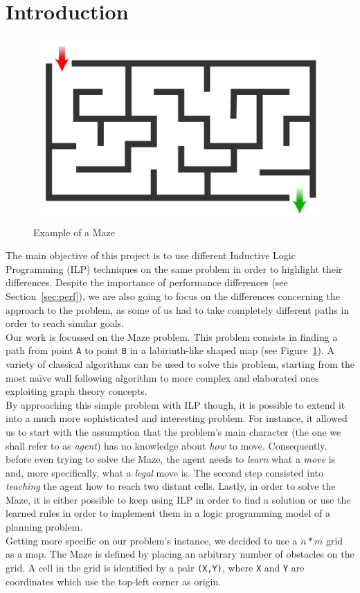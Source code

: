 \section{Introduction}\label{sec:intro}

\begin{figure}[b]
    \centering
    \includegraphics[scale=0.1]{img/Maze_simple.svg.png}
    \caption{Example of a Maze}\label{fig:fig1}
\end{figure}

The main objective of this project is to use different Inductive Logic Programming (ILP) techniques on the same problem in order to highlight
their differences. Despite the importance of performance differences (see Section~\ref{sec:perf}), we are also going to focus on the differences
concerning the approach to the problem, as some of us had to take completely different paths in order to reach similar goals.\\

Our work is focussed on the Maze problem. This problem consists in finding a path from point \texttt{A}
to point \texttt{B} in a labirinth-like shaped map (see Figure~\ref{fig:fig1}). A variety of classical algorithms
can be used to solve this problem, starting from the most naïve wall following algorithm to more complex and elaborated
ones exploiting graph theory concepts.\\
By approaching this simple problem with ILP though, it is possible to extend it into a much more sophisticated and interesting
problem. For instance, it allowed us to start with the assumption that the problem's main character (the
one we shall refer to as \emph{agent}) has no knowledge about \emph{how} to move. Consequently, before even trying
to solve the Maze, the agent needs to \emph{learn} what a \emph{move} is and, more specifically, what a \emph{legal} move is. The second
step consisted into \emph{teaching} the agent how to reach two distant cells. Lastly, in order to solve the Maze, it is either possible
to keep using ILP in order to find a solution or use the learned rules in order to implement them in a logic programming model of a planning
problem.\\

Getting more specific on our problem's instance, we decided to use a \(n * m\) grid as a map. The Maze is defined by placing an arbitrary number
of obstacles on the grid. A cell in the grid is identified by a pair \texttt{(X,Y)}, where \texttt{X} and \texttt{Y} are coordinates which use the
top-left corner as origin.
